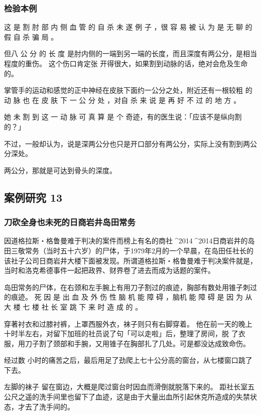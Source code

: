 \documentclass[UTF8]{ctexart}
\begin{document}
\subsubsection*{检验本例}

这 是 割 肘 部 内 侧 血 管 的 自 杀 未 遂 例 子 ，很 容 易 被 认 为 是 无 聊 的 假 自 杀 骗 局 。

但八 公 分 的 长 度 是肘内侧的一端到另一端的长度，而且深度有两公分，是相当程度的重伤。
这个伤口肯定张 开得很大，如果割到动脉的话，绝对会危及生命的。 

掌管手的运动和感觉的正中神经在皮肤下面约一公分之处，附近还有一根较粗 的 动 脉 也 在 皮 肤 下 一 公 分 处 ，对自 杀 来 说 是 再 好 不 过 的 地 方 。

她 未 割 到 这 一 动 脉 可 真 算 是 个 奇迹，有的医生说：「应该不是纵向割的？」

不过，一般却认为，说是深两公分也只是开口部分有两公分，实际上没有割到两公分深处。

两公分，那就是可达到骨头的深度。

\subsection{案例研究 13}
\subsubsection*{刀砍全身也未死的日商岩井岛田常务}

因道格拉斯‧格鲁曼难于判决的案件而榜上有名的商社^^^^2014^^^^2014日商岩井的岛田三敬常务（当时五十六岁）的尸体，于1979年2月的一个早晨，在岛田任社长的该社子公司日商岩井大楼下面被发现。所谓道格拉斯‧格鲁曼难于判决案件就是，当时和洛克希德事件一起把政界、财界卷了进去而成为话题的案件。

岛田常务的尸体，在右颈和左手腕上有用刀子割过的痕迹，胸部有数处用锥子刺过的痕迹。 
死 因 是 出 血 及 外 伤 性 脑 机 能 障 碍 ，脑机 能 障 碍 是 因 为 从 大 楼 七 楼 社 长 室 跳 下 来 时 造 成 的 。

穿著衬衣和过膝衬裤，上罩西服外衣，袜子则只有右脚穿着。 
他在前一天的晚上十时半左右，对留下加班的社员说了句「可以走啦」后，整理了房间，脱 了衣服，用刀子割了颈部和手腕，又用锥子在胸部扎了几处。可是都没达成致命伤。

经过数 小时的痛苦之后，最后用足了劲爬上七十公分高的窗台，从七楼窗口跳了下去。

左脚的袜子 留在窗边，大概是爬过窗台时因血而滑倒就脱落下来的。 
距社长室五公尺之遥的洗手间里也留下了血迹，这是由于大量出血所引起休克所造成的失禁状态，才去了洗手间的。
\end{document}
